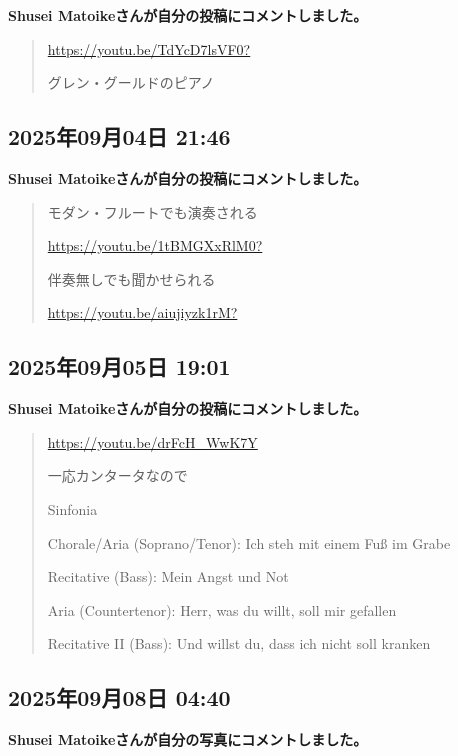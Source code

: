 \textbf{Shusei Matoikeさんが自分の投稿にコメントしました。}

\begin{quote}
\url{https://youtu.be/TdYcD7lsVF0?}

グレン・グールドのピアノ
\end{quote}

\subsection*{2025年09月04日 21:46}

\textbf{Shusei Matoikeさんが自分の投稿にコメントしました。}

\begin{quote}
モダン・フルートでも演奏される

\url{https://youtu.be/1tBMGXxRlM0?}

伴奏無しでも聞かせられる

\url{https://youtu.be/aiujiyzk1rM?}
\end{quote}

\subsection*{2025年09月05日 19:01}

\textbf{Shusei Matoikeさんが自分の投稿にコメントしました。}

\begin{quote}
\url{https://youtu.be/drFcH_WwK7Y}

一応カンタータなので

Sinfonia

Chorale/Aria (Soprano/Tenor): Ich steh mit einem Fuß im Grabe

Recitative (Bass): Mein Angst und Not

Aria (Countertenor): Herr, was du willt, soll mir gefallen

Recitative II (Bass): Und willst du, dass ich nicht soll kranken
\end{quote}

\subsection*{2025年09月08日 04:40}

\textbf{Shusei Matoikeさんが自分の写真にコメントしました。}


